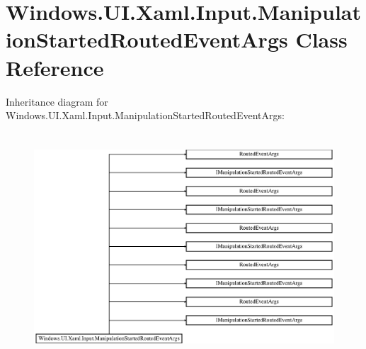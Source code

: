 \hypertarget{class_windows_1_1_u_i_1_1_xaml_1_1_input_1_1_manipulation_started_routed_event_args}{}\section{Windows.\+U\+I.\+Xaml.\+Input.\+Manipulation\+Started\+Routed\+Event\+Args Class Reference}
\label{class_windows_1_1_u_i_1_1_xaml_1_1_input_1_1_manipulation_started_routed_event_args}
Inheritance diagram for Windows.\+U\+I.\+Xaml.\+Input.\+Manipulation\+Started\+Routed\+Event\+Args\+:\begin{figure}[H]
\begin{center}
\leavevmode
\includegraphics[height=8.508287cm]{class_windows_1_1_u_i_1_1_xaml_1_1_input_1_1_manipulation_started_routed_event_args}
\end{center}
\end{figure}

